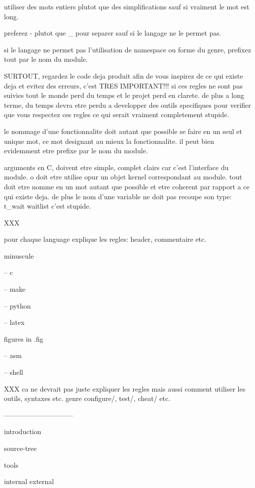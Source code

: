utiliser des mots entiers plutot que des simplifications sauf si vraiment
le mot est long.

preferez - plutot que _ pour separer sauf si le langage ne le permet pas.

si le langage ne permet pas l'utilisation de namespace ou forme du genre,
prefixez tout par le nom du module.

SURTOUT, regardez le code deja produit afin de vous inspirez de ce qui
existe deja et evitez des erreurs, c'est TRES IMPORTANT!!! si ces regles
ne sont pas suivies tout le monde perd du temps et le projet perd en
clarete. de plus a long terme, du temps devra etre perdu a developper des
outils specifiques pour verifier que vous respectez ces regles ce qui serait
vraiment completement stupide.

le nommage d'une fonctionnalite doit autant que possible se faire en un
seul et unique mot, ce mot designant au mieux la fonctionnalite. il peut bien
evidemment etre prefixe par le nom du module.

arguments en C, doivent etre simple, complet clairs car c'est l'interface
du module. o doit etre utilise opur un objet kernel correspondant au module.
tout doit etre nomme en un mot autant que possible et etre coherent par
rapport a ce qui existe deja. de plus le nom d'une variable ne doit
pas recoupe son type: t_wait waitlist c'est stupide.

XXX

%
%

pour chaque language explique les regles: header, commentaire etc.

minuscule

-- c

-- make

-- python

-- latex

figures in .fig

-- asm

-- shell

XXX
ca ne devrait pas juste expliquer les regles mais aussi comment utiliser
les outils, syntaxes etc. genre configure/, test/, cheat/ etc.

------------------------------

introduction

source-tree

tools

  internal
  external

